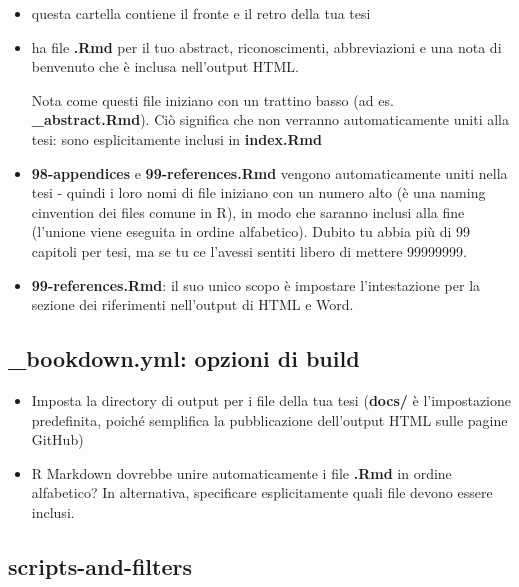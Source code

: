 \documentclass[a4paper, 11pt, nobind]{templates/ociamthesis}
\begin{document}
\begin{itemize}
\item
  questa cartella contiene il fronte e il retro della tua tesi
\item
  ha file \textbf{.Rmd} per il tuo abstract, riconoscimenti, abbreviazioni e una nota di benvenuto che è inclusa nell'output HTML.

  Nota come questi file iniziano con un trattino basso (ad es. \textbf{\_abstract.Rmd}).
  Ciò significa che non verranno automaticamente uniti alla tesi: sono esplicitamente inclusi in \textbf{index.Rmd}
\item
  \textbf{98-appendices} e \textbf{99-references.Rmd} vengono automaticamente uniti nella tesi - quindi i loro nomi di file iniziano con un numero alto (è una naming cinvention dei files comune in R), in modo che saranno inclusi alla fine (l'unione viene eseguita in ordine alfabetico). Dubito tu abbia più di 99 capitoli per tesi, ma se tu ce l'avessi sentiti libero di mettere 99999999.
\item
  \textbf{99-references.Rmd}: il suo unico scopo è impostare l'intestazione per la sezione dei riferimenti nell'output di HTML e Word.
\end{itemize}

\hypertarget{bookdown.yml-opzioni-di-build}{%
\subsection{\texorpdfstring{\textbf{\_bookdown.yml}: opzioni di build}{\_bookdown.yml: opzioni di build}}\label{bookdown.yml-opzioni-di-build}}

\begin{itemize}
\item
  Imposta la directory di output per i file della tua tesi (\textbf{docs/} è l'impostazione predefinita, poiché semplifica la pubblicazione dell'output HTML sulle pagine GitHub)
\item
  R Markdown dovrebbe unire automaticamente i file \textbf{.Rmd} in ordine alfabetico?
  In alternativa, specificare esplicitamente quali file devono essere inclusi.
\end{itemize}

\hypertarget{scripts-and-filters}{%
\subsection{\texorpdfstring{\textbf{scripts-and-filters}}{scripts-and-filters}}\label{scripts-and-filters}}
\end{document}
